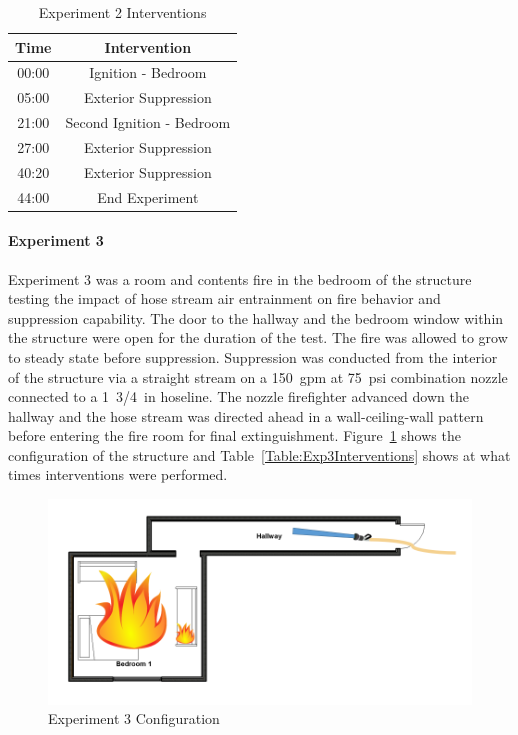 \documentclass[12pt,oneside]{book}
\begin{document}
\begin{table}[H]
	\centering
	\caption{Experiment 2 Interventions}
	\begin{tabular}{|c|c|} 
		\hline
		Time & Intervention \\ \hline \hline
		00:00 & Ignition - Bedroom \\ \hline
		05:00 & Exterior Suppression \\ \hline
		21:00 & Second Ignition - Bedroom \\ \hline
		27:00 & Exterior Suppression \\ \hline
		40:20 & Exterior Suppression \\ \hline
		44:00 & End Experiment\\ \hline
	\end{tabular}
	\label{Table:Exp2Interventions}
\end{table}

\clearpage

\paragraph{Experiment 3} \mbox{}

Experiment 3 was a room and contents fire in the bedroom of the structure testing the impact of hose stream air entrainment on fire behavior and suppression capability. The door to the hallway and the bedroom window within the structure were open for the duration of the test. The fire was allowed to grow to steady state before suppression. Suppression was conducted from the interior of the structure via a straight stream on a 150~gpm at 75~psi combination nozzle connected to a 1~3/4~in hoseline. The nozzle firefighter advanced down the hallway and the hose stream was directed ahead in a wall-ceiling-wall pattern before entering the fire room for final extinguishment. Figure~\ref{fig:Exp3Config} shows the configuration of the structure and Table~\ref{Table:Exp3Interventions} shows at what times interventions were performed.  


\begin{figure}[H]
	\centering
	\includegraphics[width=5in]{Howard_Exp_3.png}
	\caption{Experiment 3 Configuration}
	\label{fig:Exp3Config}
\end{figure}
\end{document}
